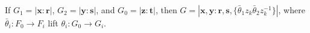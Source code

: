 If $G_1 = |\mathbf{x} : \mathbf{r}|$, $G_2 = |\mathbf{y} : \mathbf{s}|$, and $G_0 = |\mathbf{z} : \mathbf{t}|$, then $G = |\mathbf{x}, \mathbf{y} : \mathbf{r}, \mathbf{s}, \{\bar{\theta}_1 z_k \bar{\theta}_2 z_k^{-1}\}|$, where $\bar{\theta}_i: F_0 \to F_i$ lift $\theta_i: G_0 \to G_i$.
